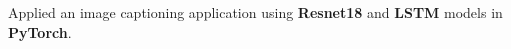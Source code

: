 \item{Applied an image captioning application using \textbf{Resnet18} and \textbf{LSTM} models in \textbf{PyTorch}.}

